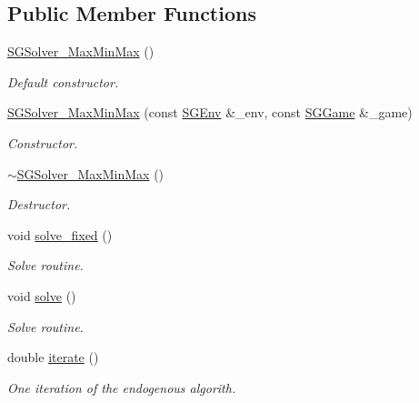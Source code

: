 \subsection*{Public Member Functions}
\begin{DoxyCompactItemize}
\item 
\mbox{\label{classSGSolver__MaxMinMax_a2f341c08f4eca886202cbcb02c690054}} 
\hyperlink{classSGSolver__MaxMinMax_a2f341c08f4eca886202cbcb02c690054}{S\+G\+Solver\+\_\+\+Max\+Min\+Max} ()
\begin{DoxyCompactList}\small\item\em Default constructor. \end{DoxyCompactList}\item 
\hyperlink{classSGSolver__MaxMinMax_a840cb488bc710b26bfc458417bd5dc2d}{S\+G\+Solver\+\_\+\+Max\+Min\+Max} (const \hyperlink{classSGEnv}{S\+G\+Env} \&\+\_\+env, const \hyperlink{classSGGame}{S\+G\+Game} \&\+\_\+game)
\begin{DoxyCompactList}\small\item\em Constructor. \end{DoxyCompactList}\item 
\mbox{\label{classSGSolver__MaxMinMax_afa0701d26f007ca8394f79eb38e4b389}} 
\hyperlink{classSGSolver__MaxMinMax_afa0701d26f007ca8394f79eb38e4b389}{$\sim$\+S\+G\+Solver\+\_\+\+Max\+Min\+Max} ()
\begin{DoxyCompactList}\small\item\em Destructor. \end{DoxyCompactList}\item 
void \hyperlink{classSGSolver__MaxMinMax_a27b1ef962eb87c0495f2d0f733432c36}{solve\+\_\+fixed} ()
\begin{DoxyCompactList}\small\item\em Solve routine. \end{DoxyCompactList}\item 
void \hyperlink{classSGSolver__MaxMinMax_aad121e84c1492524e439ffba05893f3d}{solve} ()
\begin{DoxyCompactList}\small\item\em Solve routine. \end{DoxyCompactList}\item 
double \hyperlink{classSGSolver__MaxMinMax_ab8c5d13de6ad13e26a42f901d7e1d9c8}{iterate} ()
\begin{DoxyCompactList}\small\item\em One iteration of the endogenous algorith. \end{DoxyCompactList}\item 

\end{DoxyCompactItemize}
